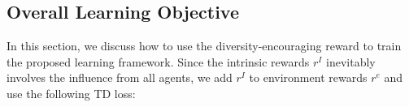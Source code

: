 
\subsection{Overall Learning Objective}
In this section, we discuss how to use the diversity-encouraging reward to train the proposed learning framework. Since the intrinsic rewards $r^I$ inevitably involves the influence from all agents, we add $r^I$ to environment rewards $r^e$ and use the following TD loss:


